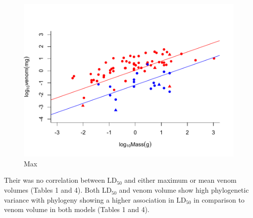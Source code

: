 \begin{figure}[h!]
  \centering
  \includegraphics[width=.95\textwidth]{ch4-snakes/figure2max.pdf}%
  \caption[Figure 2b.]{Max}
  \label{fig:Figure 2b.}
\end{figure}



Their was no correlation between LD$_{50}$ and either maximum or mean venom volumes (Tables 1 and 4). Both LD$_{50}$  and venom volume show high phylogenetic variance with phylogeny showing a higher association in LD$_{50}$ in comparison to venom volume in both models (Tables 1 and 4). 


